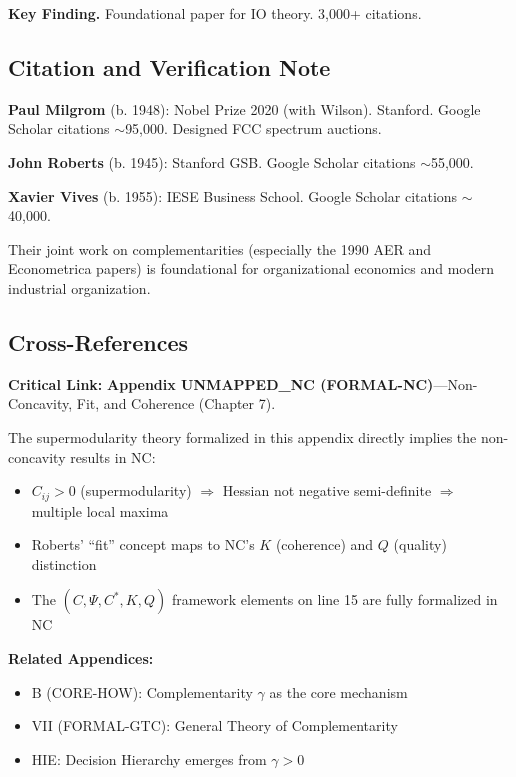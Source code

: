 \textbf{Key Finding.}
Foundational paper for IO theory. 3,000+ citations.


\subsection{Citation and Verification Note}

\textbf{Paul Milgrom} (b. 1948): Nobel Prize 2020 (with Wilson). Stanford.
Google Scholar citations $\sim$95,000. Designed FCC spectrum auctions.

\textbf{John Roberts} (b. 1945): Stanford GSB.
Google Scholar citations $\sim$55,000.

\textbf{Xavier Vives} (b. 1955): IESE Business School.
Google Scholar citations $\sim$40,000.

Their joint work on complementarities (especially the 1990 AER and
Econometrica papers) is foundational for organizational economics
and modern industrial organization.

\subsection{Cross-References}

\begin{tcolorbox}[colback=gray!5!white, colframe=gray!50!black]
\textbf{Critical Link:} \textbf{Appendix UNMAPPED_NC (FORMAL-NC)}---Non-Concavity, Fit, and Coherence (Chapter 7).

The supermodularity theory formalized in this appendix directly implies the non-concavity results in NC:
\begin{itemize}[nosep]
\item $C_{ij} > 0$ (supermodularity) $\Rightarrow$ Hessian not negative semi-definite $\Rightarrow$ multiple local maxima
\item Roberts' ``fit'' concept maps to NC's $K$ (coherence) and $Q$ (quality) distinction
\item The $(C, \Psi, C^*, K, Q)$ framework elements on line 15 are fully formalized in NC
\end{itemize}

\textbf{Related Appendices:}
\begin{itemize}[nosep]
\item B (CORE-HOW): Complementarity $\gamma$ as the core mechanism
\item VII (FORMAL-GTC): General Theory of Complementarity
\item HIE: Decision Hierarchy emerges from $\gamma > 0$
\end{itemize}
\end{tcolorbox}

